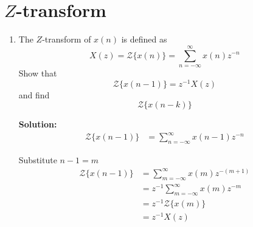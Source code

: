 \documentclass[journal,12pt,twocolumn]{IEEEtran}
\newcommand{\solution}{\noindent \textbf{Solution: }}
\numberwithin{equation}{section}
\renewcommand\thesection{\arabic{section}}
\begin{document}
	\section{$Z$-transform}
	\begin{enumerate}[label=\thesection.\arabic*]
	\item The $Z$-transform of $x(n)$ is defined as
	\begin{equation}
		\label{eq:z_trans}
		X(z)={\mathcal {Z}}\{x(n)\}=\sum _{n=-\infty }^{\infty }x(n)z^{-n}
	\end{equation}
	Show that
	\begin{equation}
		\label{eq:shift1}
		{\mathcal {Z}}\{x(n-1)\} = z^{-1}X(z)
	\end{equation}
	and find
	\begin{equation}
		{\mathcal {Z}}\{x(n-k)\} 
	\end{equation}
	
	\solution 
	\begin{align}
		{\mathcal {Z}}\{x(n-1)\} &= \sum _{n=-\infty }^{\infty }x(n - 1)z^{-n} 
	\end{align}
	
	Substitute $n - 1 = m$
	\begin{align}
		{\mathcal {Z}}\{x(n-1)\} &=  \sum _{m=-\infty }^{\infty }x(m)z^{-(m+1)} \\
		&= z^{-1} \sum _{m=-\infty }^{\infty }x(m)z^{-m} \\
		&= z^{-1} {\mathcal {Z}}\{x(m)\} \\	
		&= z^{-1} X(z)
	\end{align}		
	
	\end{enumerate}
	
	
\end{document}
